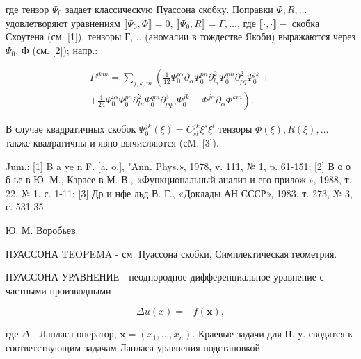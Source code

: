 \documentclass[10pt]{article}
\begin{document}
где тензор $\Psi_{0}$ задает классическую Пуассона скобку. Поправки $\Phi, R, \ldots$ удовлетворяют уравнениям $\llbracket \Psi_{0}, \Phi \rrbracket=0$, $\llbracket \Psi_{0}, R \rrbracket=\Gamma, \ldots$, где $\llbracket \cdot, \cdot \rrbracket-$ скобка Схоутена (см. [1]), тензоры Г, .. (аномалии в тождестве Якоби) выражаются через $\Psi_{0}$, Ф (см. [2]); напр.:



\[

\begin{gathered}

\Gamma^{j k m}=\sum_{j, k, m}\left(\frac{1}{12} \Psi_{0}^{i \alpha} \partial_{\alpha} \Psi_{0}^{p n} \partial_{l_{n}}^{2} \Psi_{0}^{q m} \partial_{p q}^{2} \Psi_{0}^{j k}+\right. \\

\left.+\frac{1}{24} \Psi_{0}^{i \alpha} \Psi_{0}^{p n} \partial_{l n}^{2} \Psi_{0}^{q m} \partial_{p q \alpha}^{3} \Psi_{0}^{j k}-\Phi^{j \alpha} \partial_{\alpha} \Phi^{k m}\right) .

\end{gathered}

\]



В случае квадратичных скобок $\Psi_{0}^{j k}(\xi)=C_{s l}^{j k} \xi^{s} \xi^{l}$ тензоры $\Phi(\xi), R(\xi), \ldots$ также квадратичны и явно вычисляются (сM. [3]).



Jum.: [1] B a ye n F. [a. o.], "Ann. Phys.», 1978, v. 111, № 1, p. 61-151; [2] В о о б ье в Ю. М., Карасе в М. В., «Функциональный анализ и его прилож.», 1988, т. 22, № 1, с. 1-11; [3] Др и нфе льд В. Г., «Доклады АН СССР», 1983, т. 273, № 3, с. 531-35.



Ю. М. Воробьев.



ПУАССОНА TEOPEMA - см. Пуассона скобки, Симплектическая геометрия.



ПУАССОНА УРАВНЕНИЕ - неоднородное дифференциальное уравнение с частными производными



\[

\Delta u(x)=-f(\boldsymbol{x}),

\]



где $\Delta$ - Лапласа оператор, $\boldsymbol{x}=\left(x_{1}, \ldots, x_{n}\right)$. Краевые задачи для П. у. сводятся к соответствующим задачам Лапласа уравнения подстановкой
\end{document}
